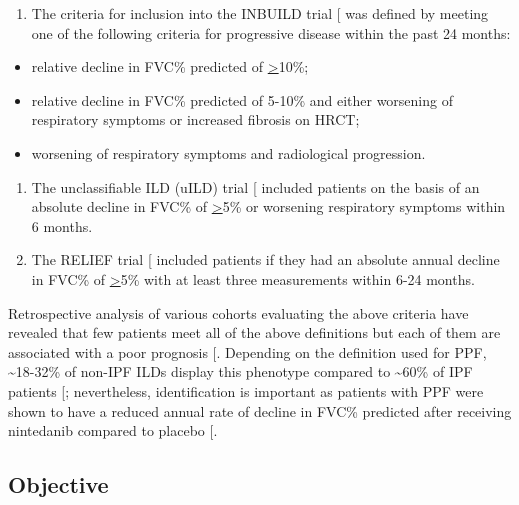 \documentclass[
]{article}
\providecommand{\tightlist}{%
  \setlength{\itemsep}{0pt}\setlength{\parskip}{0pt}}
\begin{document}
\begin{enumerate}
\def\labelenumi{\arabic{enumi}.}
\setcounter{enumi}{1}
\tightlist
\item
  The criteria for inclusion into the INBUILD trial {[}\citeproc{ref-flaherty_nintedanib_2019}{19}{]} was defined by meeting one of the following criteria for progressive disease within the past 24 months:
\end{enumerate}

\begin{itemize}
\tightlist
\item
  relative decline in FVC\% predicted of \underline{>}10\%;
\item
  relative decline in FVC\% predicted of 5-10\% and either worsening of respiratory symptoms or increased fibrosis on HRCT;
\item
  worsening of respiratory symptoms and radiological progression.
\end{itemize}

\begin{enumerate}
\def\labelenumi{\arabic{enumi}.}
\setcounter{enumi}{2}
\item
  The unclassifiable ILD (uILD) trial {[}\citeproc{ref-maher_pirfenidone_2020}{20}{]} included patients on the basis of an absolute decline in FVC\% of \underline{>}5\% or worsening respiratory symptoms within 6 months.
\item
  The RELIEF trial {[}\citeproc{ref-behr_pirfenidone_2021}{21}{]} included patients if they had an absolute annual decline in FVC\% of \underline{>}5\% with at least three measurements within 6-24 months.
\end{enumerate}

Retrospective analysis of various cohorts evaluating the above criteria have revealed that few patients meet all of the above definitions but each of them are associated with a poor prognosis {[}\citeproc{ref-khor_patient_2023}{22}{]}. Depending on the definition used for PPF, \textasciitilde18-32\% of non-IPF ILDs display this phenotype compared to \textasciitilde60\% of IPF patients {[}\citeproc{ref-rajan_progressive_2023}{27}{]}; nevertheless, identification is important as patients with PPF were shown to have a reduced annual rate of decline in FVC\% predicted after receiving nintedanib compared to placebo {[}\citeproc{ref-flaherty_nintedanib_2019}{19}{]}.

\subsection{Objective}\label{objective}
\end{document}
